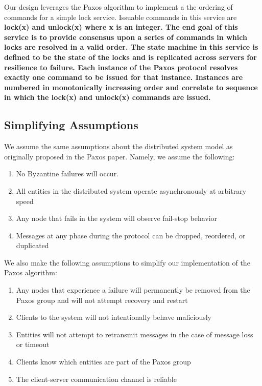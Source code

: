 \documentclass[11pt, onecolumn]{article}
\begin{document}
Our design leverages the Paxos algorithm to implement a the ordering of commands for a simple lock service.
Issuable commands in this service are \bf{lock(x)} and \bf{unlock(x)} where \bf{x} is an integer.
The end goal of this service is to provide consensus upon a series of commands in which locks are resolved in a valid order.
The state machine in this service is defined to be the state of the locks and is replicated across servers for resilience to failure.
Each instance of the Paxos protocol resolves exactly one command to be issued for that instance.
Instances are numbered in monotonically increasing order and correlate to sequence in which the \bf{lock(x)} and \bf{unlock(x)} commands are issued.

\subsection{Simplifying Assumptions}

We assume the same assumptions about the distributed system model as originally proposed in the Paxos paper. Namely, we assume the following:

\begin{enumerate}
\item No Byzantine failures will occur.
\item All entities in the distributed system operate asynchronously at arbitrary speed
\item Any node that fails in the system will observe fail-stop behavior
\item Messages at any phase during the protocol can be dropped, reordered, or duplicated
\end{enumerate}

We also make the following assumptions to simplify our implementation of the Paxos algorithm:

\begin{enumerate}
\item Any nodes that experience a failure will permanently be removed from the Paxos group and will not attempt recovery and restart
\item Clients to the system will not intentionally behave maliciously
\item Entities will not attempt to retransmit messages in the case of message loss or timeout
\item Clients know which entities are part of the Paxos group
\item The client-server communication channel is reliable
\end{enumerate}
\end{document}
